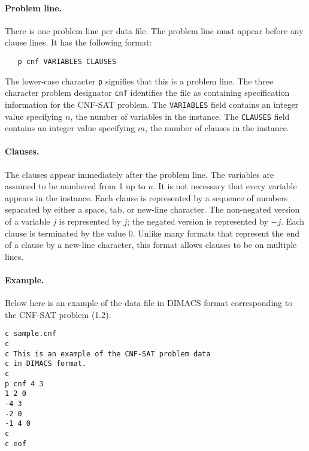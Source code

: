 \documentclass[11pt,draft]{article}
\begin{document}
\newpage

\paragraph{Problem line.} There is one problem line per data file. The
problem line must appear before any clause lines. It has the following
format:

\begin{verbatim}
   p cnf VARIABLES CLAUSES
\end{verbatim}

\noindent
The lower-case character \verb|p| signifies that this is a problem
line. The three character problem designator \verb|cnf| identifies the
file as containing specification information for the CNF-SAT problem.
The \verb|VARIABLES| field contains an integer value specifying $n$,
the number of variables in the instance. The \verb|CLAUSES| field
contains an integer value specifying $m$, the number of clauses in the
instance.

\paragraph{Clauses.} The clauses appear immediately after the problem
line. The variables are assumed to be numbered from 1 up to $n$. It is
not necessary that every variable appears in the instance. Each clause
is represented by a sequence of numbers separated by either a space,
tab, or new-line character. The non-negated version of a variable $j$
is represented by $j$; the negated version is represented by $-j$. Each
clause is terminated by the value 0. Unlike many formats that represent
the end of a clause by a new-line character, this format allows clauses
to be on multiple lines.

\paragraph{Example.} Below here is an example of the data file in
DIMACS format corresponding to the CNF-SAT problem (1.2).

\begin{footnotesize}
\begin{verbatim}
c sample.cnf
c
c This is an example of the CNF-SAT problem data
c in DIMACS format.
c
p cnf 4 3
1 2 0
-4 3
-2 0
-1 4 0
c
c eof
\end{verbatim}
\end{footnotesize}

\newpage
\end{document}
